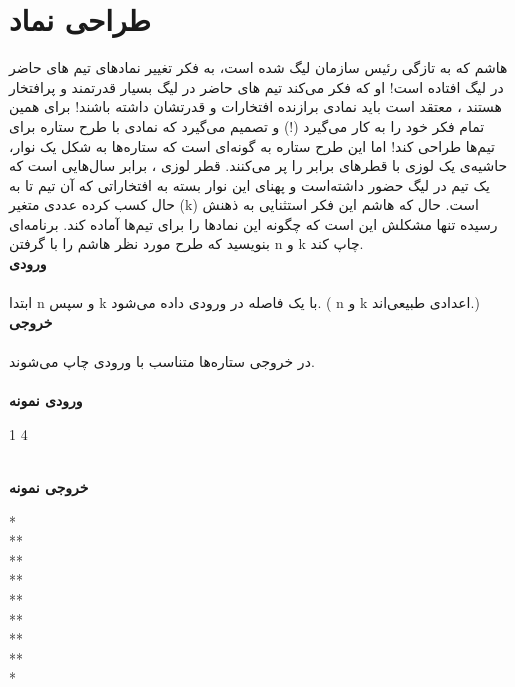 \documentclass[]{article}
\newcommand{\inputsample}[1]{
    ~\\
    \textbf{ورودی نمونه}
    ~\\
    \begin{tcolorbox}[breakable,boxrule=0pt]
        \begin{latin}
            \large{
                #1
            }
        \end{latin}
    \end{tcolorbox}
}
\newcommand{\outputsample}[1]{
    ~\\
    \textbf{خروجی نمونه}

    \begin{tcolorbox}[breakable,boxrule=0pt]
        \begin{latin}
            \large{
                #1
            }
        \end{latin}
    \end{tcolorbox}
}
\begin{document}
\section{طراحی نماد}
هاشم که به تازگی رئیس سازمان لیگ شده است، به فکر تغییر نمادهای تیم های حاضر در لیگ افتاده است! او که فکر می‌کند تیم های حاضر در لیگ بسیار قدرتمند و پرافتخار هستند ، معتقد است باید نمادی برازنده افتخارات و قدرتشان داشته باشند! برای همین تمام فکر خود را به کار می‌گیرد (!) و تصمیم می‌گیرد که نمادی با طرح ستاره برای تیم‌ها طراحی کند! اما این طرح ستاره به گونه‌ای است که ستاره­‌ها به شکل یک نوار، حاشیه‌ی یک لوزی با قطرهای برابر را پر می‌کنند. قطر لوزی 
، برابر سال‌هایی است که یک تیم در لیگ حضور داشته‌است و پهنای این نوار بسته به افتخاراتی که آن تیم تا به حال کسب کرده عددی متغیر (k) است. حال که هاشم این فکر استثنایی به ذهنش رسیده تنها مشکلش این است که چگونه این نمادها را برای تیم‌ها آماده کند. برنامه‌ای بنویسید که طرح مورد نظر هاشم را با گرفتن n و k چاپ کند.\\

\textbf{ورودی}
\\\\
ابتدا n و سپس k با یک فاصله در ورودی داده می‌شود. ( n و k اعدادی طبیعی‌اند.)\\

\textbf{خروجی}
\\\\
در خروجی ستاره‌ها متناسب با ورودی چاپ می‌شوند.
\\
\inputsample{
1 4
}

\outputsample{
\texttt{}\texttt{\char32}\texttt{\char32}\texttt{\char32}*\\
\texttt{\char32}\texttt{\char32}\texttt{\char32}*\texttt{\char32}*\\
\texttt{\char32}\texttt{\char32}*\texttt{\char32}\texttt{\char32}\texttt{\char32}*\\
\texttt{\char32}*\texttt{\char32}\texttt{\char32}\texttt{\char32}\texttt{\char32}\texttt{\char32}*\\
*\texttt{\char32}\texttt{\char32}\texttt{\char32}\texttt{\char32}\texttt{\char32}\texttt{\char32}\texttt{\char32}*\\
\texttt{\char32}*\texttt{\char32}\texttt{\char32}\texttt{\char32}\texttt{\char32}\texttt{\char32}*\\ 
\texttt{\char32}\texttt{\char32}*\texttt{\char32}\texttt{\char32}\texttt{\char32}*\\
\texttt{\char32}\texttt{\char32}\texttt{\char32}*\texttt{\char32}*\\
\texttt{\char32}\texttt{\char32}\texttt{\char32}\texttt{\char32}*
}
\end{document}
